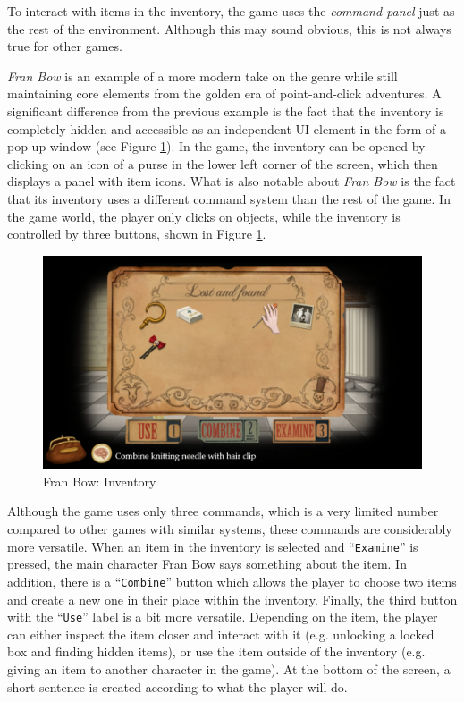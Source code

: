 To interact with items in the inventory, the game uses the \textit{command panel} just as the rest of the environment. Although this may sound obvious, this is not always true for other games. 

\textit{Fran Bow} is an example of a more modern take on the genre while still maintaining core elements from the golden era of point-and-click adventures.  A significant difference from the previous example is the fact that the inventory is completely hidden and accessible as an independent UI element in the form of a pop-up window (see Figure \ref{fig:I-FranBow}). In the game, the inventory can be opened by clicking on an icon of a purse in the lower left corner of the screen, which then displays a panel with item icons. What is also notable about \textit{Fran Bow} is the fact that its inventory uses a different command system than the rest of the game. In the game world, the player only clicks on objects, while the inventory is controlled by three buttons, shown in Figure \ref{fig:I-FranBow}. 

\begin{figure}[H]
\centering
\includegraphics[width=.8\linewidth]{img/Fran_Bow.png}
\caption{Fran Bow: Inventory}
\label{fig:I-FranBow}
\end{figure}

Although the game uses only three commands, which is a very limited number compared to other games with similar systems, these commands are considerably more versatile. When an item in the inventory is selected and “\texttt{Examine}” is pressed, the main character Fran Bow says something about the item. In addition, there is a “\texttt{Combine}” button which allows the player to choose two items and create a new one in their place within the inventory. Finally, the third button with the “\texttt{Use}” label is a bit more versatile. Depending on the item, the player can either inspect the item closer and interact with it (e.g. unlocking a locked box and finding hidden items), or use the item outside of the inventory (e.g. giving an item to another character in the game). At the bottom of the screen, a short sentence is created according to what the player will do.

